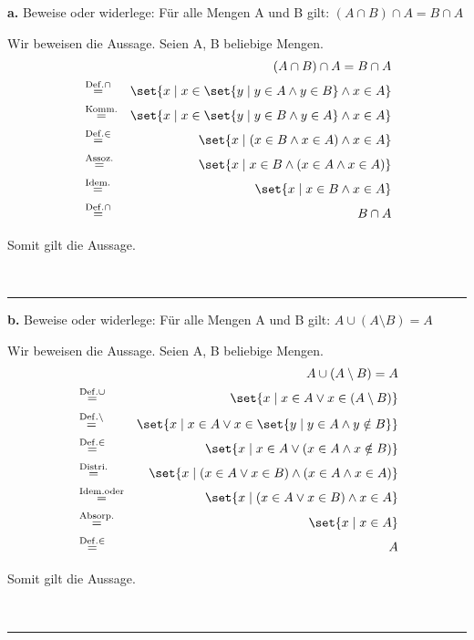 \documentclass[10pt,leqno ]{article}
\DeclarePairedDelimiter\set\{\}
\newcommand\customeq[1]{\overset{\mathrm{#1}}{=}}
\theoremstyle{definition}
\newenvironment{solution}[1][L]{\begin{doublespace}\textbf{#1.}\quad }{\ \rule{0.5em}{0.5em}\end{doublespace}}
\begin{document}
\begin{solution}[a]
Beweise oder widerlege: Für alle Mengen A und B gilt: \( (A \cap B) \cap A = B \cap A \)

Wir beweisen die Aussage. Seien A, B beliebige Mengen.
\begin{align*}
    & & (A \cap B) \cap A = B \cap A \\
    & \customeq{Def. \cap} & \set{x \mid x \in \set{y \mid y \in A \land y \in B} \land x \in A} \\
    & \customeq{Komm.} & \set{x \mid x \in \set{y \mid y \in B \land y \in A} \land x \in A} \\
    & \customeq{Def. \in} & \set{x \mid (x \in B \land x \in A) \land x \in A} \\
    & \customeq{Assoz.} & \set{x \mid x \in B \land (x \in A \land x \in A)} \\
    & \customeq{Idem.} & \set{x \mid x \in B \land x \in A} \\
    & \customeq{Def. \cap} & B \cap A \\
\end{align*}

Somit gilt die Aussage.

\end{solution}

\begin{solution}[b]
Beweise oder widerlege: Für alle Mengen A und B gilt: \( A \cup (A \setminus B ) = A  \)

Wir beweisen die Aussage. Seien A, B beliebige Mengen.
\begin{align*}
    & & A \cup (A \setminus B ) = A \\
    & \customeq{Def. \cup} & \set{x \mid x \in A \lor x \in (A \setminus B)} \\
    & \customeq{Def. \setminus} & \set{x \mid x \in A \lor x \in \set{y \mid y \in A \land y \notin B}} \\
    & \customeq{Def. \in} & \set{x \mid x \in A \lor (x \in A \land x \notin B)} \\
    & \customeq{Distri.} & \set{x \mid (x \in A \lor x \in B) \land (x \in A \land x \in A)} \\
    & \customeq{Idem. oder} & \set{x \mid (x \in A \lor x \in B) \land x \in A} \\
    & \customeq{Absorp.} & \set{x \mid x \in A} \\
    & \customeq{Def. \in} & A \\
\end{align*}

Somit gilt die Aussage.

\end{solution}
\end{document}
